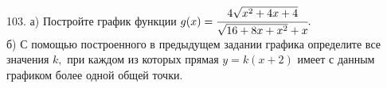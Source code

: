 103. а) Постройте график функции $g(x)=\cfrac{4\sqrt{x^2+4x+4}}{\sqrt{16+8x+x^2}+x}.$\\
б) С помощью построенного в предыдущем задании графика определите все значения $k,$ при каждом из которых прямая $y=k(x+2)$ имеет с данным графиком более одной общей точки.\\
